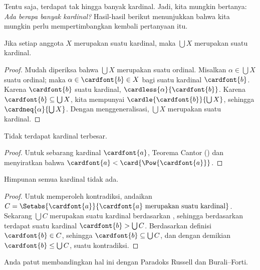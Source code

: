 \documentclass[../../../include/open-logic-section]{subfiles}
\begin{document}
Tentu saja, terdapat tak hingga banyak kardinal. Jadi, kita mungkin bertanya:
\emph{Ada berapa banyak kardinal?} Hasil-hasil berikut menunjukkan bahwa
kita mungkin perlu mempertimbangkan kembali pertanyaan itu.

\begin{prop}
Jika setiap anggota $X$ merupakan suatu kardinal, maka $\bigcup X$ merupakan
suatu kardinal.
\end{prop}

\begin{proof}
Mudah diperiksa bahwa $\bigcup X$ merupakan suatu ordinal. Misalkan
$\alpha \in \bigcup X$ suatu ordinal; maka
$\alpha \in \cardfont{b} \in X$ bagi suatu kardinal $\cardfont{b}$. Karena
$\cardfont{b}$ suatu kardinal, $\cardless{\alpha}{\cardfont{b}}$. Karena
$\cardfont{b} \subseteq \bigcup X$, kita mempunyai
$\cardle{\cardfont{b}}{\bigcup X}$, sehingga
$\cardneq{\alpha}{\bigcup X}$. Dengan menggeneralisasi, $\bigcup X$
merupakan suatu kardinal.
\end{proof}

\begin{thm}
Tidak terdapat kardinal terbesar.
\end{thm}

\begin{proof}
Untuk sebarang kardinal $\cardfont{a}$, Teorema Cantor
() dan
 menyiratkan bahwa
$\cardfont{a} < \card{\Pow{\cardfont{a}}}$.
\end{proof}

\begin{thm}
Himpunan semua kardinal tidak ada.
\end{thm}

\begin{proof}
Untuk memperoleh kontradiksi, andaikan
$C = \Setabs{\cardfont{a}}{\cardfont{a} \text{ merupakan suatu kardinal}}$.
Sekarang $\bigcup C$ merupakan suatu kardinal berdasarkan
, sehingga berdasarkan
 terdapat suatu kardinal
$\cardfont{b} > \bigcup C$. Berdasarkan definisi $\cardfont{b} \in C$,
sehingga $\cardfont{b} \subseteq \bigcup{C}$, dan dengan demikian
$\cardfont{b} \leq \bigcup C$, suatu kontradiksi.
\end{proof}

Anda patut membandingkan hal ini dengan Paradoks Russell dan Burali--Forti.
\end{document}
